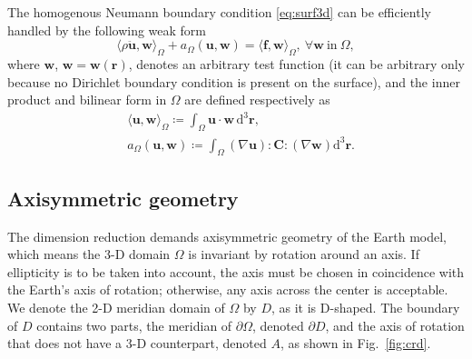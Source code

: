 \documentclass[extra]{gji}
\begin{document}
The homogenous Neumann boundary condition \eqref{eq:surf3d} can be
efficiently handled by the following weak form 
\begin{equation}
  \langle \rho\ddot{\mathbf{u}},\mathbf{w}\rangle_{\Omega}+
  a_{\Omega}\left(\mathbf{u},\mathbf{w}\right)=\langle 
  \mathbf{f},\mathbf{w}\rangle_{\Omega}
  ,\ \forall\mathbf{w}\ \text{in}\ \Omega,
  \label{eq:3dweak}
\end{equation}
where $\mathbf{w}$, $\mathbf{w}=\mathbf{w}\left(\mathbf{r}\right)$, denotes an
arbitrary test function (it can be arbitrary only because no Dirichlet
boundary condition is present on the surface), and the inner product and 
bilinear form in $\Omega$ are defined respectively as
\begin{align}
  & \langle \mathbf{u},\mathbf{w}\rangle _{\Omega} \coloneqq
  \int_{\Omega}\mathbf{u}\cdot\mathbf{w}\,\text{d}^{3}\mathbf{r},\label{eq:3din}\\[.5em]
  & a_{\Omega}\left(\mathbf{u},\mathbf{w}\right) \coloneqq
  \int_{\Omega}\left(\nabla\mathbf{u}\right):\mathbf{C}:\left(\nabla\mathbf{w}\right)\text{d}^{3}\mathbf{r}.
  \label{eq:3dbi}
\end{align}

\subsection{Axisymmetric geometry}
The dimension reduction demands axisymmetric geometry
of the Earth model, which means the 3-D domain $\Omega$
is invariant by rotation around an axis. 
If ellipticity is to be taken into account, the
axis must be chosen in coincidence with the Earth's
axis of rotation; otherwise, any axis across the center is acceptable. 
We denote the 2-D meridian domain of $\Omega$ by $D$,
as it is D-shaped. The boundary of $D$ contains two parts, the meridian
of $\partial\Omega$, denoted $\partial D$, and the axis of rotation
that does not have a 3-D counterpart, denoted $A$, as shown in 
Fig.~\ref{fig:crd}.
\end{document}
